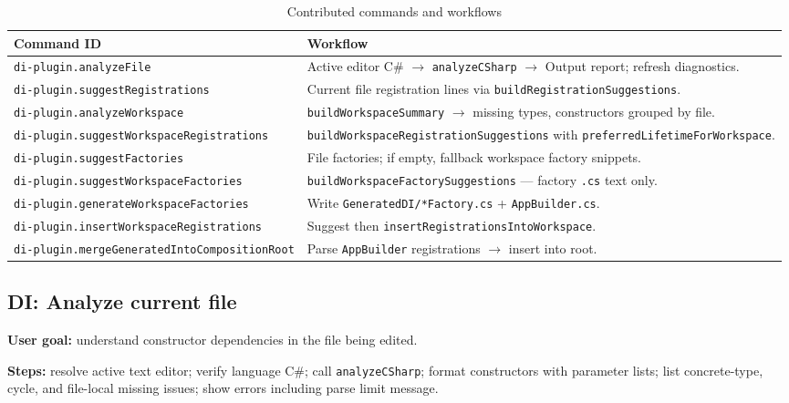 \begin{table}[htbp]
\centering
\caption{Contributed commands and workflows}
\label{tab:commands}
\small
\begin{tabular}{|p{3.8cm}|p{9cm}|}
\hline
\textbf{Command ID} & \textbf{Workflow} \\
\hline
\texttt{di-plugin.analyzeFile} & Active editor C\# $\rightarrow$ \texttt{analyzeCSharp} $\rightarrow$ Output report; refresh diagnostics. \\
\hline
\texttt{di-plugin.suggestRegistrations} & Current file registration lines via \texttt{buildRegistrationSuggestions}. \\
\hline
\texttt{di-plugin.analyzeWorkspace} & \texttt{buildWorkspaceSummary} $\rightarrow$ missing types, constructors grouped by file. \\
\hline
\texttt{di-plugin.suggestWorkspaceRegistrations} & \texttt{buildWorkspaceRegistrationSuggestions} with \texttt{preferredLifetimeForWorkspace}. \\
\hline
\texttt{di-plugin.suggestFactories} & File factories; if empty, fallback workspace factory snippets. \\
\hline
\texttt{di-plugin.suggestWorkspaceFactories} & \texttt{buildWorkspaceFactorySuggestions} --- factory \texttt{.cs} text only. \\
\hline
\texttt{di-plugin.generateWorkspaceFactories} & Write \texttt{GeneratedDI/*Factory.cs} + \texttt{AppBuilder.cs}. \\
\hline
\texttt{di-plugin.insertWorkspaceRegistrations} & Suggest then \texttt{insertRegistrationsIntoWorkspace}. \\
\hline
\texttt{di-plugin.mergeGeneratedIntoCompositionRoot} & Parse \texttt{AppBuilder} registrations $\rightarrow$ insert into root. \\
\hline
\end{tabular}
\end{table}

\subsection{DI: Analyze current file}

\textbf{User goal:} understand constructor dependencies in the file being edited.

\textbf{Steps:} resolve active text editor; verify language C\#; call \texttt{analyzeCSharp}; format constructors with parameter lists; list concrete-type, cycle, and file-local missing issues; show errors including parse limit message.

